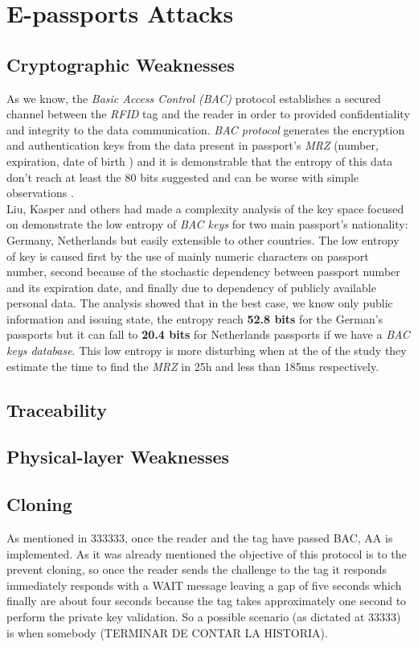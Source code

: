 \documentclass{acm_proc_article-sp}
\begin{document}
\section{E-passports Attacks}

\subsection{Cryptographic Weaknesses}
As we know, the \textit{Basic Access Control (BAC)} protocol establishes a secured channel between 
the \textit{RFID} tag and the reader in order to provided confidentiality and integrity to the 
data communication. \textit{BAC protocol} generates the encryption and authentication keys from the data 
present in passport's \textit {MRZ} (number, expiration, date of birth ) and it is demonstrable 
that the entropy of this data don’t reach at least the 80 bits suggested and can be worse 
with simple observations \cite{JUAR2005} \cite{02COPA}.\\
Liu, Kasper and others \cite{02COPA} had made a complexity analysis of the key space focused on 
demonstrate the low entropy of \textit{BAC keys} for two main passport’s nationality: Germany, 
Netherlands but easily extensible to other countries. The low entropy of key is caused 
first by the use of mainly numeric characters on passport number, 
second because of the stochastic dependency between passport number and its expiration 
date, and finally due to dependency of publicly available personal data. The analysis 
showed that in the best case, we know only public information and issuing state, the 
entropy reach \textbf {52.8 bits} for the German’s passports but it can fall to \textbf {20.4 bits} for 
Netherlands passports if we have a \textit{BAC keys database}. This low entropy is more disturbing 
when at the of the study they estimate the time to find the \textit{MRZ} in 25h and less than 185ms 
respectively.


\subsection{Traceability}

\subsection{Physical-layer Weaknesses}

\subsection{Cloning}
As mentioned in 333333, once the reader and the tag have passed BAC, AA is implemented. As it was already mentioned the objective of this protocol is to the prevent cloning, so once the reader sends the challenge to the tag it responds immediately responds with a WAIT message leaving a gap of five seconds which finally are about four seconds because the tag takes approximately one second to perform the private key validation. So a possible scenario (as dictated at 33333) is when somebody (TERMINAR DE CONTAR LA HISTORIA).
\end{document}
